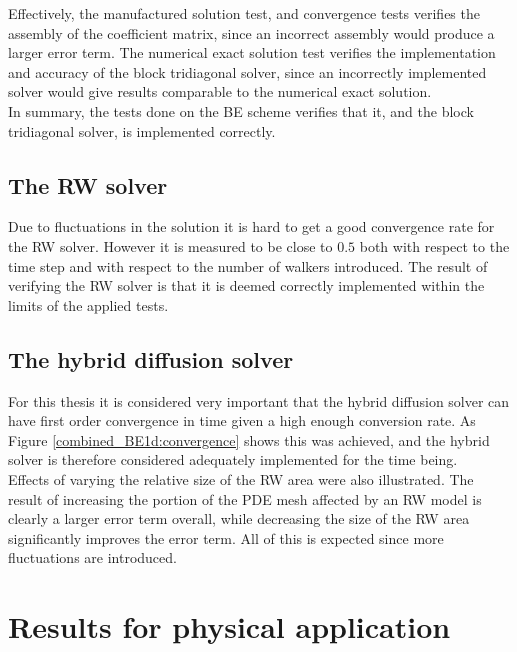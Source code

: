 \noindent Effectively, the manufactured solution test, and convergence tests verifies the assembly of the coefficient matrix, since an incorrect assembly would produce a larger error term. 
The numerical exact solution test verifies the implementation and accuracy of the block tridiagonal solver, since an incorrectly implemented solver would give results comparable to the numerical exact solution. \\

\noindent In summary, the tests done on the BE scheme verifies that it, and the block tridiagonal solver, is implemented correctly.

\subsection{The RW solver}
Due to fluctuations in the solution it is hard to get a good convergence rate for the RW solver. 
However it is measured to be close to $0.5$ both with respect to the time step and with respect to the number of walkers introduced. 
The result of verifying the RW solver is that it is deemed correctly implemented within the limits of the applied tests.

\subsection{The hybrid diffusion solver}
For this thesis it is considered very important that the hybrid diffusion solver can have first order convergence in time given a high enough conversion rate. 
As Figure \ref{combined_BE1d:convergence} shows this was achieved, and the hybrid solver is therefore considered adequately implemented for the time being.\\

Effects of varying the relative size of the RW area were also illustrated. 
The result of increasing the portion of the PDE mesh affected by an RW model is clearly a larger error term overall, while decreasing the size of the RW area significantly improves the error term. 
All of this is expected since more fluctuations are introduced.

\section{Results for physical application}

